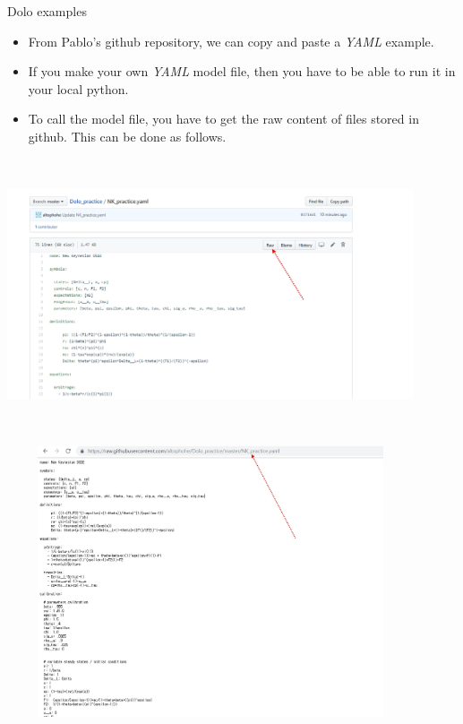\documentclass{beamer}
\begin{document}
    \begin{frame}{Dolo examples}
        \begin{itemize}
            \item From Pablo's github repository, we can copy and paste a \textit{YAML} example. 
            \item If you make your own \textit{YAML} model file, then you have to be able to run it in your local python. 
            \item To call the model file, you have to get the raw content of files stored in github. This can be done as follows. 
        \end{itemize}
    \end{frame}
     \begin{frame}{}
         \includegraphics[width=12cm, height= 8cm]{dolo8.jpg}
    \end{frame}
     \begin{frame}{}
         \includegraphics[width=12cm, height= 8cm]{dolo9.jpg}
    \end{frame}
\end{document}
